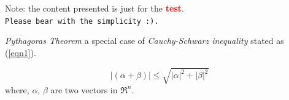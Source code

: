 \documentclass{beamer}
\begin{document}

\begin{frame}[t]
\vspace*{1cm}
 
Note: the content presented is just for the \textcolor{red}{\bf test}. \\
\texttt{Please bear with the simplicity :).}\\[0.4cm]
\begin{block}
{{\em Pythagoras Theorem} a special case of {\em Cauchy-Schwarz inequality} stated as (\ref{eqn1}).}
\end{block}

\begin{equation}
 |(\alpha+\beta)| \leq \sqrt{|\alpha|^2 + |\beta|^2} \label{eqn1}
\end{equation}
\vskip 1cm
where, $\alpha$, $\beta$ are two vectors in $\Re^n$.\\

\end{frame}
\end{document}
